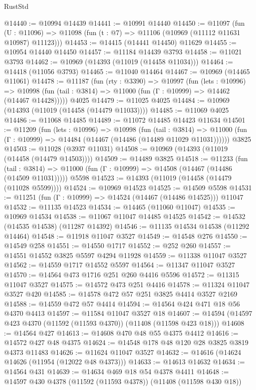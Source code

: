 \begin{lexlean}{RustStd}
\begin{coremodule}
@14440 := @10994 @14439
@14441 := @10991 @14440
@14450 := @11097
    (fun (U : @11096) => @11098 (fun (t : @7) => @11106 (@10969 (@11112 @11631 @10987) @11123)))
@14453 := @14415 (@14441 @14450) @11629
@14455 := @10954 @14440 @14450
@14457 := @11184 @14439 @3793
@14458 := @11021 @3793
@14462 := @10969 (@14393 (@11019 (@14458 @11034)))
@14464 := @14418 (@11056 @3793)
@14465 := @11040 @14464
@14467 := @10969 (@14465 @11061)
@14478 := @11187
    (fun (rty : @3390) =>
    @10997
      (fun (lets : @10996) =>
      @10998 (fun (tail : @3814) => @11000 (fun (Γ : @10999) => @14462 (@14467 @14428)))))
    @4025
@14479 := @11025 @4025
@14484 := @10969 (@14393 (@11019 (@14458 (@14479 @11033))))
@14485 := @11069 @4025
@14486 := @11068 @14485
@14489 := @11072 @14485 @14423 @11634
@14501 := @11209
    (fun (lets : @10996) =>
    @10998
      (fun (tail : @3814) =>
      @11000 (fun (Γ : @10999) => @14484 (@14467 (@14486 (@14489 @11029 @11031))))))
    @3825
@14503 := @11028 (@3937 @11031)
@14508 := @10969 (@14393 (@11019 (@14458 (@14479 @14503))))
@14509 := @14489 @3825
@14518 := @11233
    (fun (tail : @3814) => @11000 (fun (Γ : @10999) => @14508 (@14467 (@14486 (@14509 @11031)))))
    @5598
@14523 := @14393 (@11019 (@14458 (@14479 (@11028 @5599))))
@14524 := @10969 @14523
@14525 := @14509 @5598
@14531 := @11251 (fun (Γ : @10999) => @14524 (@14467 (@14486 @14525))) @11047
@14532 := @11135 @14523
@14534 := @14465 (@11060 @11047)
@14535 := @10969 @14534
@14538 := @11067 @11047 @14485 @14525
@14542 := @14532 (@14535 @14538) (@11287 @14392)
@14546 := @11135 @14534 @14538 (@11292 @14464)
@14548 := @11918 @11047 @3527
@14549 := @14548 @276
@14550 := @14549 @258
@14551 := @14550 @1717
@14552 := @252 @260
@14557 := @14551 @14552 @3825 @5597 @4294 @11928
@14559 := @11338 @11047 @3527
@14562 := @14559 @1717 @14552 @5597
@14564 := @11347 @11047 @3527
@14570 := @14564 @473 @1716 @251 @260 @4416 @5596
@14572 := @11315 @11047 @3527
@14575 := @14572 @473 @251 @4416
@14578 := @11324 @11047 @3527 @420
@14585 := @14578 @472 @57 @251 @3825 @4414 @3527 @2169
@14588 := @14559 @472 @57 @4414
@14594 := @14564 @424 @471 @18 @56 @4370 @4413
@14597 := @11584 @11047 @3527 @18
@14607 := @14594 (@14597 @423 @4370 (@11592 (@11593 @4370)) (@11408 (@11598 @423 @18)))
@14608 := @14564 @427
@14613 := @14608 @470 @48 @55 @4375 @4412
@14616 := @14572 @427 @48 @4375
@14624 := @14548 @178 @48 @120 @28 @3825 @3819 @4373 @11483
@14626 := @11624 @11047 @3527
@14632 := @14616 (@14624 @14626 (@11954 (@12022 @48 @4373)))
@14633 := @14613 @14632
@14634 := @14564 @431
@14639 := @14634 @469 @18 @54 @4378 @4411
@14648 := @14597 @430 @4378 (@11592 (@11593 @4378)) (@11408 (@11598 @430 @18))

\end{coremodule}
\end{lexlean}
